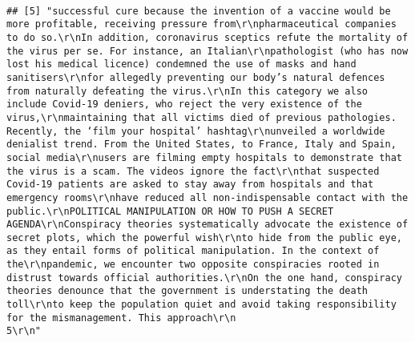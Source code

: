 \documentclass[
]{book}
\begin{document}
\begin{verbatim}
                                                                                                                                                                                                                                                                                                                                                                                                                                                                                                                                                                                           
## [5] "successful cure because the invention of a vaccine would be more profitable, receiving pressure from\r\npharmaceutical companies to do so.\r\nIn addition, coronavirus sceptics refute the mortality of the virus per se. For instance, an Italian\r\npathologist (who has now lost his medical licence) condemned the use of masks and hand sanitisers\r\nfor allegedly preventing our body’s natural defences from naturally defeating the virus.\r\nIn this category we also include Covid-19 deniers, who reject the very existence of the virus,\r\nmaintaining that all victims died of previous pathologies. Recently, the ‘film your hospital’ hashtag\r\nunveiled a worldwide denialist trend. From the United States, to France, Italy and Spain, social media\r\nusers are filming empty hospitals to demonstrate that the virus is a scam. The videos ignore the fact\r\nthat suspected Covid-19 patients are asked to stay away from hospitals and that emergency rooms\r\nhave reduced all non-indispensable contact with the public.\r\nPOLITICAL MANIPULATION OR HOW TO PUSH A SECRET AGENDA\r\nConspiracy theories systematically advocate the existence of secret plots, which the powerful wish\r\nto hide from the public eye, as they entail forms of political manipulation. In the context of the\r\npandemic, we encounter two opposite conspiracies rooted in distrust towards official authorities.\r\nOn the one hand, conspiracy theories denounce that the government is understating the death toll\r\nto keep the population quiet and avoid taking responsibility for the mismanagement. This approach\r\n                                                                                                    5\r\n"                                                                                                                                                                                                                                                                                                                                                                                                                                                                                                                                                                                                                                                                                                                                                                                                                                                                                                                                                                                                                                                                                               
\end{verbatim}
\end{document}
